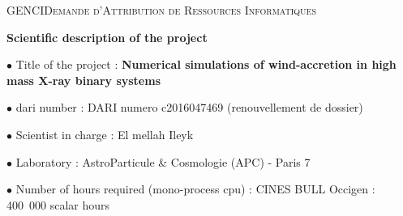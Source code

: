 \documentclass[
    a4paper, 
    12pt, onecolumn,
]{article}
\newcommand{\rubrique}{\bigskip \noindent $\bullet$ }
\begin{document}


 
\noindent GENCI\hfill \textsc{Demande d'Attribution de Ressources Informatiques}

\begin{center}
\Large  \bf
Scientific description of the project
\end{center}
\bigskip

\rubrique Title of the project : {\bf Numerical simulations of wind-accretion in \hspace*{4.42cm} high mass X-ray binary systems}

\rubrique  {\sc dari} number :
\hfill
DARI numero c2016047469 (renouvellement de dossier)

\rubrique  Scientist in charge : 
\hfill
E{\sc l mellah} Ileyk


\rubrique Laboratory :  
\hfill
AstroParticule \& Cosmologie (APC) - Paris 7


\rubrique  Number of hours required (mono-process {\sc cpu}) :
     \newline CINES BULL Occigen      : \hfill  400\ 000 scalar hours
\end{document}
